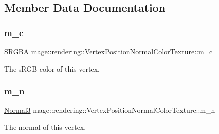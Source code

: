 \subsection{Member Data Documentation}
\hypertarget{structmage_1_1rendering_1_1_vertex_position_normal_color_texture_aaa99420952a8a2a1ba557487ce448e17}{}\label{structmage_1_1rendering_1_1_vertex_position_normal_color_texture_aaa99420952a8a2a1ba557487ce448e17} 
\subsubsection{\texorpdfstring{m\+\_\+c}{m\_c}}
{\footnotesize\ttfamily \hyperlink{structmage_1_1_s_r_g_b_a}{S\+R\+G\+BA} mage\+::rendering\+::\+Vertex\+Position\+Normal\+Color\+Texture\+::m\+\_\+c}

The s\+R\+GB color of this vertex. \hypertarget{structmage_1_1rendering_1_1_vertex_position_normal_color_texture_aa42ee4c320dec19edeef4a7018d68329}{}\label{structmage_1_1rendering_1_1_vertex_position_normal_color_texture_aa42ee4c320dec19edeef4a7018d68329} 
\subsubsection{\texorpdfstring{m\+\_\+n}{m\_n}}
{\footnotesize\ttfamily \hyperlink{structmage_1_1_normal3}{Normal3} mage\+::rendering\+::\+Vertex\+Position\+Normal\+Color\+Texture\+::m\+\_\+n}

The normal of this vertex. \hypertarget{structmage_1_1rendering_1_1_vertex_position_normal_color_texture_a7eb2e2d7970bd3794d9b6f9f3b1db3e7}{}\label{structmage_1_1rendering_1_1_vertex_position_normal_color_texture_a7eb2e2d7970bd3794d9b6f9f3b1db3e7} 
